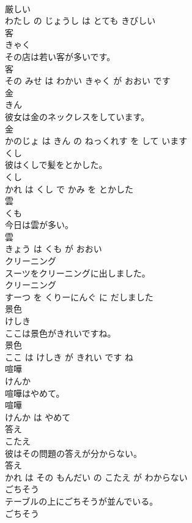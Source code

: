 \documentclass[8pt]{extreport}
\begin{document}
\begin{CJK}{UTF8}{min}
\\	厳しい 
\\	わたし の じょうし は とても きびしい			
\\	客	
\\	きゃく			
\\	その店は若い客が多いです。	
\\	客 
\\	その みせ は わかい きゃく が おおい です			
\\	金	
\\	きん			
\\	彼女は金のネックレスをしています。	
\\	金 
\\	かのじょ は きん の ねっくれす を して います			
\\	くし	
\\	彼はくしで髪をとかした。	
\\	くし 
\\	かれ は くし で かみ を とかした			
\\	雲	
\\	くも			
\\	今日は雲が多い。	
\\	雲 
\\	きょう は くも が おおい			
\\	クリーニング	
\\	スーツをクリーニングに出しました。	
\\	クリーニング 
\\	すーつ を くりーにんぐ に だしました			
\\	景色	
\\	けしき			
\\	ここは景色がきれいですね。	
\\	景色 
\\	ここ は けしき が きれい です ね			
\\	喧嘩	
\\	けんか			
\\	喧嘩はやめて。	
\\	喧嘩 
\\	けんか は やめて			
\\	答え	
\\	こたえ			
\\	彼はその問題の答えが分からない。	
\\	答え 
\\	かれ は その もんだい の こたえ が わからない			
\\	ごちそう	
\\	テーブルの上にごちそうが並んでいる。	
\\	ごちそう 

\end{CJK}
\end{document}
